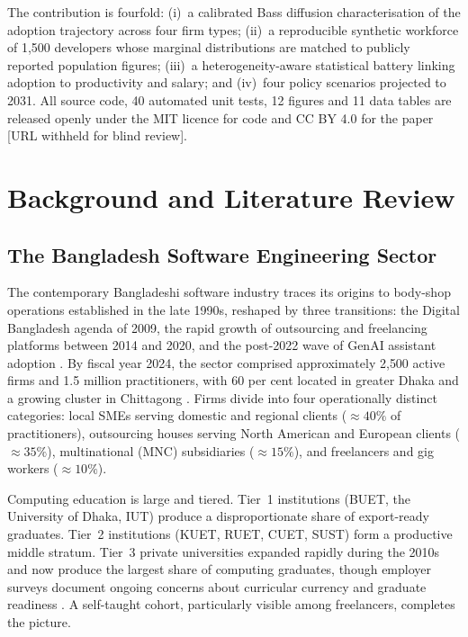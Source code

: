 \documentclass[11pt,a4paper]{article}
\begin{document}
The contribution is fourfold: (i)~a calibrated Bass diffusion
characterisation of the adoption trajectory across four firm types;
(ii)~a reproducible synthetic workforce of 1{,}500 developers whose
marginal distributions are matched to publicly reported population
figures; (iii)~a heterogeneity-aware statistical battery linking
adoption to productivity and salary; and (iv)~four policy scenarios
projected to 2031. All source code, 40 automated unit tests, 12
figures and 11 data tables are released openly under the MIT licence
for code and CC BY 4.0 for the paper [URL withheld for blind review].

\section{Background and Literature Review}

\subsection{The Bangladesh Software Engineering Sector}

The contemporary Bangladeshi software industry traces its origins to
body-shop operations established in the late 1990s, reshaped by three
transitions: the Digital Bangladesh agenda of 2009, the rapid growth
of outsourcing and freelancing platforms between 2014 and 2020, and
the post-2022 wave of GenAI assistant adoption
\citep{LICTReport2023,WorldBank2024DigitalBD,KaramSiddiqueAlam2025}.
By fiscal year 2024, the sector comprised approximately 2{,}500 active
firms and 1.5 million practitioners, with 60 per cent located in
greater Dhaka and a growing cluster in Chittagong \citep{BBS2024LFS}.
Firms divide into four operationally distinct categories: local SMEs
serving domestic and regional clients ($\approx40\%$ of practitioners),
outsourcing houses serving North American and European clients
($\approx35\%$), multinational (MNC) subsidiaries ($\approx15\%$),
and freelancers and gig workers ($\approx10\%$).

Computing education is large and tiered. Tier~1 institutions (BUET,
the University of Dhaka, IUT) produce a disproportionate share of
export-ready graduates. Tier~2 institutions (KUET, RUET, CUET, SUST)
form a productive middle stratum. Tier~3 private universities
expanded rapidly during the 2010s and now produce the largest share
of computing graduates, though employer surveys document ongoing
concerns about curricular currency and graduate readiness
\citep{ChowdhuryRahman2025}. A self-taught cohort, particularly
visible among freelancers, completes the picture.
\end{document}
